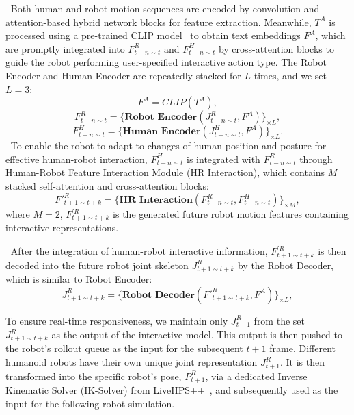 $\ $
Both human and robot motion sequences are encoded by convolution and attention-based hybrid network blocks for feature extraction. Meanwhile, $T^A$ is processed using a pre-trained CLIP model~\cite{radford2021learning} to obtain text embeddings $F^A$, which are promptly integrated into $F^R_{t-n \sim t}$ and $F^H_{t-n \sim t}$ by cross-attention blocks to guide the robot performing user-specified interactive action type. The Robot Encoder and Human Encoder are repeatedly stacked for $L$ times, and we set $L=3$:
\begin{equation}
F^A = CLIP(T^A),
\end{equation}
\begin{equation}
F^R_{t-n \sim t} = \{ \textbf{Robot Encoder}(J^R_{t-n \sim t}, F^A)\}_{\times L},
\end{equation}
\begin{equation}
F^H_{t-n \sim t} = \{ \textbf{Human Encoder}(J^H_{t-n \sim t}, F^A)\}_{\times L}.
\end{equation}
$\ $
To enable the robot to adapt to changes of human position and posture for effective human-robot interaction, $F^H_{t-n \sim t}$ is integrated with $F^R_{t-n \sim t}$ through Human-Robot Feature Interaction Module (HR Interaction), which contains
$M$ stacked self-attention and cross-attention blocks:
\begin{equation}
F'^R_{t+1 \sim t+k} = \{ \textbf{HR Interaction}(F^R_{t-n \sim t}, F^H_{t-n \sim t})\}_{\times M},
\end{equation}
where $M=2$, $F^{'R}_{t+1 \sim t+k}$ is the generated future robot motion features containing interactive representations.


$\ $
After the integration of human-robot interactive information, $F^{'R}_{t+1 \sim t+k}$ is then decoded into the future robot joint skeleton $J^R_{t+1 \sim t+k}$ by the Robot Decoder, which is similar to Robot Encoder:
\begin{equation}
J^R_{t+1 \sim t+k} = \{ \textbf{Robot Decoder}(F'^R_{t+1 \sim t+k}, F^A)\}_{\times L},
\end{equation}

 To ensure real-time responsiveness, we maintain only $J^R_{t+1}$ from the set $J^R_{t+1 \sim t+k}$ as the output of the interactive model. This output is then pushed to the robot's rollout queue as the input for the subsequent $t+1$ frame. Different humanoid robots have their own unique joint representation $J^R_{t+1}$. It is then transformed into the specific robot's pose, $P^R_{t+1}$, via a dedicated Inverse Kinematic Solver (IK-Solver) from LiveHPS++~\cite{ren2025livehps++}, and subsequently used as the input for the following robot simulation.


